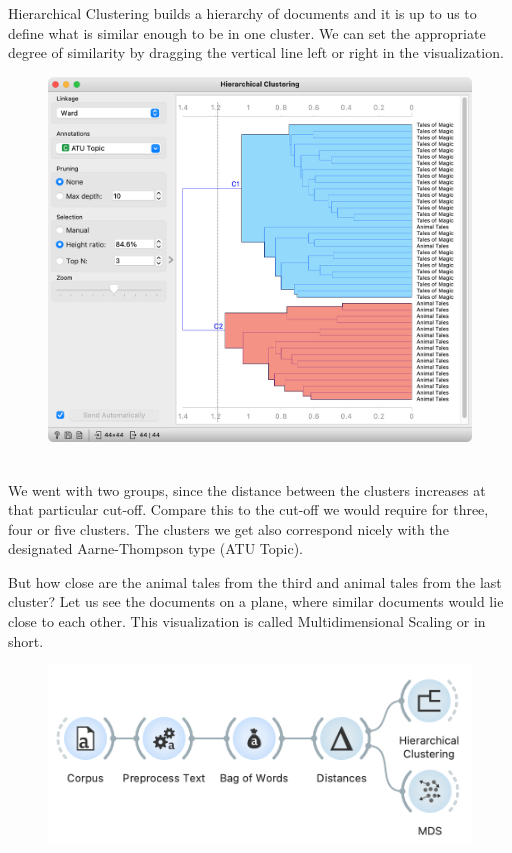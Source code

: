 Hierarchical Clustering builds a hierarchy of documents and it is up to us to define what is similar enough to be in one cluster. We can set the appropriate degree of similarity by dragging the vertical line left or right in the visualization.

\begin{figure}
    \includegraphics[scale=0.35]{hier-clust-clusters.png}
    \caption{$\;$}
\end{figure}

We went with two groups, since the distance between the clusters increases at that particular cut-off. Compare this to the cut-off we would require for three, four or five clusters. The clusters we get also correspond nicely with the designated Aarne-Thompson type (ATU Topic).

\newpage
\clearpage

But how close are the animal tales from the third and animal tales from the last cluster? Let us see the documents on a plane, where similar documents would lie close to each other. This visualization is called Multidimensional Scaling or  in short.

\vspace{-0.2cm}
\begin{figure}[h]
  \centering
  \includegraphics[width=\linewidth]{workflow2.png}%
  \caption{}
\end{figure}
\vspace{-0.3cm}

